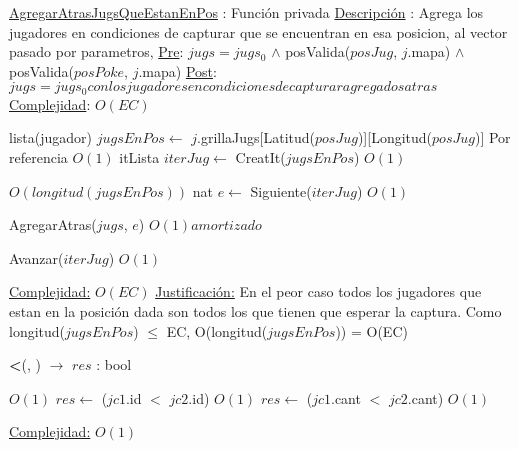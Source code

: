 \begin{Algoritmos}
\begin{algorithm}[H]
\begin{algorithmic}[1]
\Statex \underline{AgregarAtrasJugsQueEstanEnPos} : Funci\'on privada 
\Statex \underline{Descripci\'on} : Agrega los jugadores en condiciones de capturar que se encuentran en esa posicion, al vector pasado por parametros,   
\Statex \underline{Pre}: $jugs = jugs_0$ $\land$  posValida($posJug$, $j$.mapa) $\land$ posValida($posPoke$, $j$.mapa)
\Statex \underline{Post}: $jugs = jugs_0 con los jugadores en condiciones de capturar agregados atras$
\Statex \underline{Complejidad}: $O(EC)$ 

\State lista(jugador) $jugsEnPos \gets$ $j$.grillaJugs[Latitud($posJug$)][Longitud($posJug$)] \Comment Por referencia $O(1)$
\State itLista $iterJug \gets$ CreatIt($jugsEnPos$) \Comment $O(1)$

 \Comment $O(longitud(jugsEnPos))$
    \State nat $e \gets$ Siguiente($iterJug$) \Comment $O(1)$

        \State AgregarAtras($jugs$, $e$) \Comment $O(1) amortizado$
    \EndIf 

    \State Avanzar($iterJug$) \Comment $O(1)$


\EndWhile

\medskip
\Statex \underline{Complejidad:} $O(EC)$
\Statex \underline{Justificaci\'on:} En el peor caso todos los jugadores que estan en la posici\'on dada son todos los que tienen que esperar la captura. Como longitud($jugsEnPos$) $\leq$ EC, O(longitud($jugsEnPos$)) = O(EC)

\end{algorithmic}
\end{algorithm}  


\begin{algorithm}[H]
{\textbf{<}(, )  $\to$ $res$ : bool}
\begin{algorithmic}[1]

    \Comment $O(1)$
    \State $res \gets$ ($jc1$.id $<$  $jc2$.id)    \Comment $O(1)$
\Else
    \State $res \gets$ ($jc1$.cant $<$  $jc2$.cant)  \Comment $O(1)$
\EndIf

\medskip
\Statex \underline{Complejidad:} $O(1)$

\end{algorithmic}
\end{algorithm}  
  
\end{Algoritmos}



